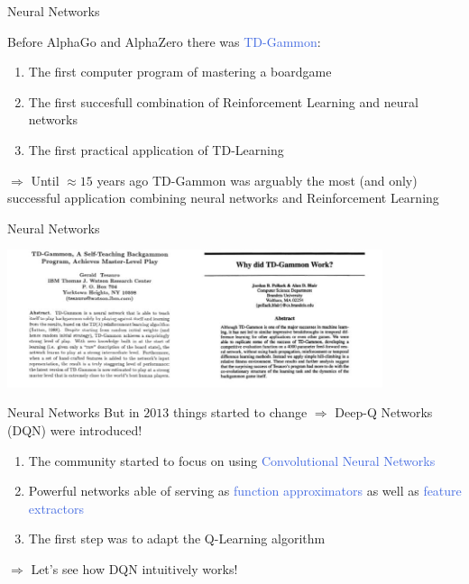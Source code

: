\documentclass{beamer}
\begin{document}
\begin{frame}{Neural Networks}

	Before AlphaGo and AlphaZero there was \textcolor{RoyalBlue}{TD-Gammon}:
	\begin{enumerate}
		\item The first computer program of mastering a boardgame  
		\item The first succesfull combination of Reinforcement Learning and neural networks
		\item The first practical application of TD-Learning
	\end{enumerate}

	\begin{center}
		$\Rightarrow$ Until $\approx 15$ years ago TD-Gammon was arguably the most (and only) successful application combining neural networks and Reinforcement Learning
	\end{center}
\end{frame}


\begin{frame}{Neural Networks}

	\centering
		\includegraphics[width=11cm]{./Images/tdgammon}

\end{frame}

\begin{frame}{Neural Networks}
	But in $2013$ things started to change $\Rightarrow$ \textcolor{skymagenta}{Deep-Q Networks} (DQN) were introduced!

	\begin{enumerate}
		\item The community started to focus on using \textcolor{RoyalBlue}{Convolutional Neural Networks}
		\item Powerful networks able of serving as \textcolor{RoyalBlue}{function approximators} as well as \textcolor{RoyalBlue}{feature extractors}
		\item The first step was to adapt the Q-Learning algorithm 
	\end{enumerate}
	
	\bigskip 

	$\Rightarrow$ Let's see how DQN intuitively works!

\end{frame}
\end{document}

